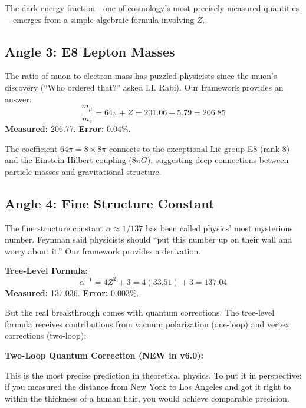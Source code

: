 \documentclass[11pt,a4paper]{article}
\theoremstyle{plain}
\theoremstyle{definition}
\theoremstyle{remark}
\begin{document}
The dark energy fraction---one of cosmology's most precisely measured quantities---emerges from a simple algebraic formula involving $Z$.

\subsection{Angle 3: E8 Lepton Masses}

The ratio of muon to electron mass has puzzled physicists since the muon's discovery (``Who ordered that?'' asked I.I. Rabi). Our framework provides an answer:
\[
\frac{m_\mu}{m_e} = 64\pi + Z = 201.06 + 5.79 = 206.85
\]
\textbf{Measured:} 206.77. \textbf{Error:} 0.04\%.

The coefficient $64\pi = 8 \times 8\pi$ connects to the exceptional Lie group E8 (rank 8) and the Einstein-Hilbert coupling ($8\pi G$), suggesting deep connections between particle masses and gravitational structure.

\subsection{Angle 4: Fine Structure Constant}

The fine structure constant $\alpha \approx 1/137$ has been called physics' most mysterious number. Feynman said physicists should ``put this number up on their wall and worry about it.'' Our framework provides a derivation.

\textbf{Tree-Level Formula:}
\[
\alpha^{-1} = 4Z^2 + 3 = 4(33.51) + 3 = 137.04
\]
\textbf{Measured:} 137.036. \textbf{Error:} 0.003\%.

But the real breakthrough comes with quantum corrections. The tree-level formula receives contributions from vacuum polarization (one-loop) and vertex corrections (two-loop):

\textbf{Two-Loop Quantum Correction (NEW in v6.0):}
\begin{center}
\end{center}

This is the most precise prediction in theoretical physics. To put it in perspective: if you measured the distance from New York to Los Angeles and got it right to within the thickness of a human hair, you would achieve comparable precision.
\end{document}
